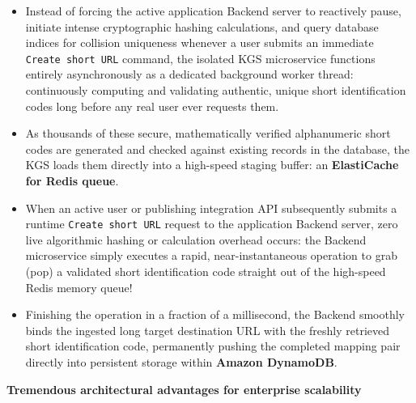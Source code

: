 \begin{itemize}
\tightlist
\item
  Instead of forcing the active application Backend server to reactively
  pause, initiate intense cryptographic hashing calculations, and query
  database indices for collision uniqueness whenever a user submits an
  immediate \texttt{Create\ short\ URL} command, the isolated KGS
  microservice functions entirely asynchronously as a dedicated
  background worker thread: continuously computing and validating
  authentic, unique short identification codes long before any real user
  ever requests them.
\item
  As thousands of these secure, mathematically verified alphanumeric
  short codes are generated and checked against existing records in the
  database, the KGS loads them directly into a high-speed staging
  buffer: an \textbf{ElastiCache for Redis queue}.
\item
  When an active user or publishing integration API subsequently submits
  a runtime \texttt{Create\ short\ URL} request to the application
  Backend server, zero live algorithmic hashing or calculation overhead
  occurs: the Backend microservice simply executes a rapid,
  near-instantaneous operation to grab (pop) a validated short
  identification code straight out of the high-speed Redis memory queue!
\item
  Finishing the operation in a fraction of a millisecond, the Backend
  smoothly binds the ingested long target destination URL with the
  freshly retrieved short identification code, permanently pushing the
  completed mapping pair directly into persistent storage within
  \textbf{Amazon DynamoDB}.
\end{itemize}

\vspace{0.5em}\noindent\textbf{Tremendous architectural advantages for enterprise
scalability}\par


